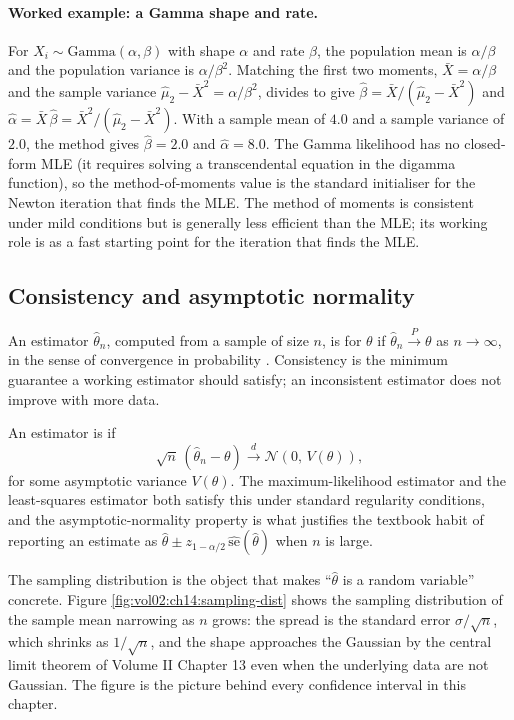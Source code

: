 \paragraph{Worked example: a Gamma shape and rate.}
For $X_{i} \sim \mathrm{Gamma}(\alpha, \beta)$ with shape $\alpha$
and rate $\beta$, the population mean is $\alpha/\beta$ and the
population variance is $\alpha/\beta^{2}$. Matching the first two
moments, $\bar{X} = \alpha/\beta$ and the sample variance
$\hat{\mu}_{2} - \bar{X}^{2} = \alpha/\beta^{2}$, divides to give
$\hat{\beta} = \bar{X}/(\hat{\mu}_{2} - \bar{X}^{2})$ and
$\hat{\alpha} = \bar{X}\,\hat{\beta} = \bar{X}^{2}/(\hat{\mu}_{2} -
\bar{X}^{2})$. With a sample mean of $4.0$ and a sample variance
of $2.0$, the method gives $\hat{\beta} = 2.0$ and $\hat{\alpha}
= 8.0$. The Gamma likelihood has no closed-form MLE (it requires
solving a transcendental equation in the digamma function), so the
method-of-moments value is the standard initialiser for the
Newton iteration that finds the MLE. The method of moments is
consistent under mild conditions but is generally less efficient
than the MLE; its working role is as a fast starting point for the
iteration that finds the MLE.

\subsection{Consistency and asymptotic normality}

An estimator $\hat{\theta}_{n}$, computed from a sample of size $n$,
is  for $\theta$ if $\hat{\theta}_{n}
\xrightarrow{P} \theta$ as $n \to \infty$, in the sense of
convergence in probability \cite[ch.~5, ch.~6]{text:wasserman2004}.
Consistency is the minimum guarantee a working estimator should
satisfy; an inconsistent estimator does not improve with more data.

An estimator is  if
\[
\sqrt{n}\,(\hat{\theta}_{n} - \theta)
\xrightarrow{d} \mathcal{N}\!\left(0,\, V(\theta)\right),
\]
for some asymptotic variance $V(\theta)$. The maximum-likelihood
estimator and the least-squares estimator both satisfy this under
standard regularity conditions, and the asymptotic-normality
property is what justifies the textbook habit of reporting an
estimate as $\hat{\theta} \pm z_{1-\alpha/2}\, \widehat{\mathrm{se}}(\hat{\theta})$
when $n$ is large.

The sampling distribution is the object that makes ``$\hat{\theta}$
is a random variable'' concrete. Figure
\ref{fig:vol02:ch14:sampling-dist} shows the sampling distribution
of the sample mean narrowing as $n$ grows: the spread is the
standard error $\sigma/\sqrt{n}$, which shrinks as $1/\sqrt{n}$, and
the shape approaches the Gaussian by the central limit theorem of
Volume II Chapter 13 even when the underlying data are not Gaussian.
The figure is the picture behind every confidence interval in this
chapter.

